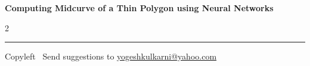 \documentclass[9pt,portrait]{article}
\begin{document}
\footnotesize


\begin{center}
\Large{\textbf{Computing Midcurve of a Thin Polygon using Neural Networks}}  
\end{center}

\begin{multicols}{2}

\end{multicols}

\rule{\linewidth}{0.25pt}
\scriptsize
Copyleft \textcopyleft\  Send suggestions to 
\href{http://www.yogeshkulkarni.com}{yogeshkulkarni@yahoo.com}
\end{document}
